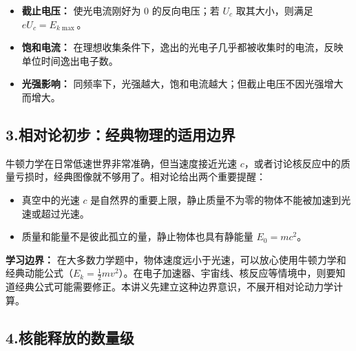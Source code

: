 \begin{center}


\label{fig:photoelectric-ui-graph}
\end{center}

\begin{itemize}
  \item \textbf{截止电压：} 使光电流刚好为 0 的反向电压；若 $U_c$ 取其大小，则满足 $eU_c=E_{k\max}$。
  \item \textbf{饱和电流：} 在理想收集条件下，逸出的光电子几乎都被收集时的电流，反映单位时间逸出电子数。
  \item \textbf{光强影响：} 同频率下，光强越大，饱和电流越大；但截止电压不因光强增大而增大。
\end{itemize}

\subsection*{3.\quad 相对论初步：经典物理的适用边界}

牛顿力学在日常低速世界非常准确，但当速度接近光速 $c$，或者讨论核反应中的质量亏损时，经典图像就不够用了。相对论给出两个重要提醒：
\begin{itemize}
  \item 真空中的光速 $c$ 是自然界的重要上限，静止质量不为零的物体不能被加速到光速或超过光速。
  \item 质量和能量不是彼此孤立的量，静止物体也具有静能量 $E_0=mc^2$。
\end{itemize}

\begin{samepage}
\begin{center}


\label{fig:relativity-boundary}
\end{center}
\end{samepage}

\textbf{学习边界：} 在大多数力学题中，物体速度远小于光速，可以放心使用牛顿力学和经典动能公式（$E_k=\frac12mv^2$）。在电子加速器、宇宙线、核反应等情境中，则要知道经典公式可能需要修正。本讲义先建立这种边界意识，不展开相对论动力学计算。

\subsection*{4.\quad 核能释放的数量级}

